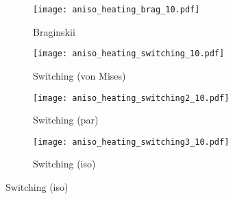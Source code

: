 \begin{figure}[t]
    \hfill
    \begin{subfigure}{0.49\textwidth}
      \texttt{[image: aniso\_heating\_brag\_10.pdf]}
      \caption{Braginskii}%
      \label{fig:aniso_heating_brag_10}
    \end{subfigure}
    \hfill
    \begin{subfigure}{0.49\textwidth}
      \texttt{[image: aniso\_heating\_switching\_10.pdf]}
      \caption{Switching (von Mises)}%
      \label{fig:aniso_heating_switching_10}
    \end{subfigure}
    \hfill
    \begin{subfigure}{0.49\textwidth}
      \texttt{[image: aniso\_heating\_switching2\_10.pdf]}
      \caption{Switching (par)}%
      \label{fig:aniso_heating_switching2_10}
    \end{subfigure}
    \hfill
    \begin{subfigure}{0.49\textwidth}
      \texttt{[image: aniso\_heating\_switching3\_10.pdf]}
      \caption{Switching (iso)}%
      \label{fig:aniso_heating_switching3_10}
    \end{subfigure}
\label{fig:anisotropic_heating}%
\end{figure}

